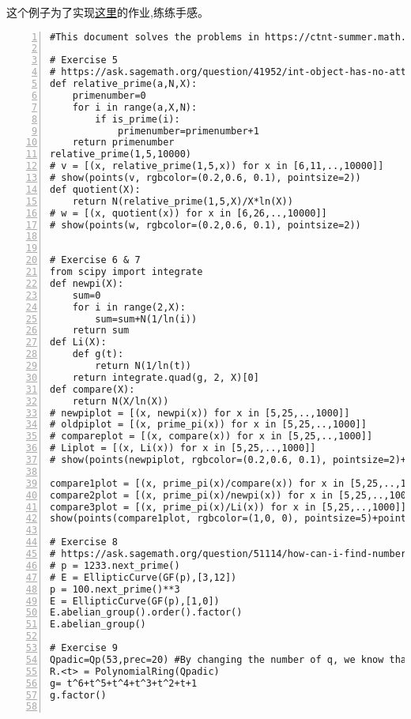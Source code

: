 \documentclass[11pt]{amsart}
\begin{document}
这个例子为了实现\href{https://ctnt-summer.math.uconn.edu/wp-content/uploads/sites/1632/2020/06/CTNT2020-CompNT-Exercises.pdf}{这里}的作业,练练手感。
\begin{lstlisting}[numbers=left,numberstyle=\tiny,numbersep=10pt]
#This document solves the problems in https://ctnt-summer.math.uconn.edu/wp-content/uploads/sites/1632/2020/06/CTNT2020-CompNT-Exercises.pdf

# Exercise 5
# https://ask.sagemath.org/question/41952/int-object-has-no-attribute-is_prime/
def relative_prime(a,N,X):
    primenumber=0
    for i in range(a,X,N):
        if is_prime(i):
            primenumber=primenumber+1
    return primenumber
relative_prime(1,5,10000)
# v = [(x, relative_prime(1,5,x)) for x in [6,11,..,10000]]
# show(points(v, rgbcolor=(0.2,0.6, 0.1), pointsize=2))
def quotient(X):
    return N(relative_prime(1,5,X)/X*ln(X))
# w = [(x, quotient(x)) for x in [6,26,..,10000]]
# show(points(w, rgbcolor=(0.2,0.6, 0.1), pointsize=2))


# Exercise 6 & 7
from scipy import integrate
def newpi(X):
    sum=0
    for i in range(2,X):
        sum=sum+N(1/ln(i))
    return sum
def Li(X):
    def g(t):
        return N(1/ln(t))
    return integrate.quad(g, 2, X)[0]
def compare(X):
    return N(X/ln(X))
# newpiplot = [(x, newpi(x)) for x in [5,25,..,1000]]
# oldpiplot = [(x, prime_pi(x)) for x in [5,25,..,1000]]
# compareplot = [(x, compare(x)) for x in [5,25,..,1000]]
# Liplot = [(x, Li(x)) for x in [5,25,..,1000]]
# show(points(newpiplot, rgbcolor=(0.2,0.6, 0.1), pointsize=2)+points(oldpiplot, rgbcolor=(0.2,0.2, 1), pointsize=5)+points(compareplot, rgbcolor=(0.9,0.1, 0.1), pointsize=2) +points(Liplot, rgbcolor=(0,0, 0), pointsize=2))

compare1plot = [(x, prime_pi(x)/compare(x)) for x in [5,25,..,1000]]
compare2plot = [(x, prime_pi(x)/newpi(x)) for x in [5,25,..,1000]]
compare3plot = [(x, prime_pi(x)/Li(x)) for x in [5,25,..,1000]]
show(points(compare1plot, rgbcolor=(1,0, 0), pointsize=5)+points(compare2plot, rgbcolor=(0,1,0), pointsize=5)+points(compare3plot, rgbcolor=(0,0,1), pointsize=5))

# Exercise 8
# https://ask.sagemath.org/question/51114/how-can-i-find-number-of-elements-of-n-torsion-points-on-an-elliptic-curve-over-finite-field/
# p = 1233.next_prime()
# E = EllipticCurve(GF(p),[3,12])
p = 100.next_prime()**3
E = EllipticCurve(GF(p),[1,0])
E.abelian_group().order().factor()
E.abelian_group()

# Exercise 9
Qpadic=Qp(53,prec=20) #By changing the number of q, we know that \phi_7(x) factors exactly when q \mod 1,2,4,6 mod 7.
R.<t> = PolynomialRing(Qpadic)
g= t^6+t^5+t^4+t^3+t^2+t+1
g.factor()


\end{lstlisting}
\end{document}
